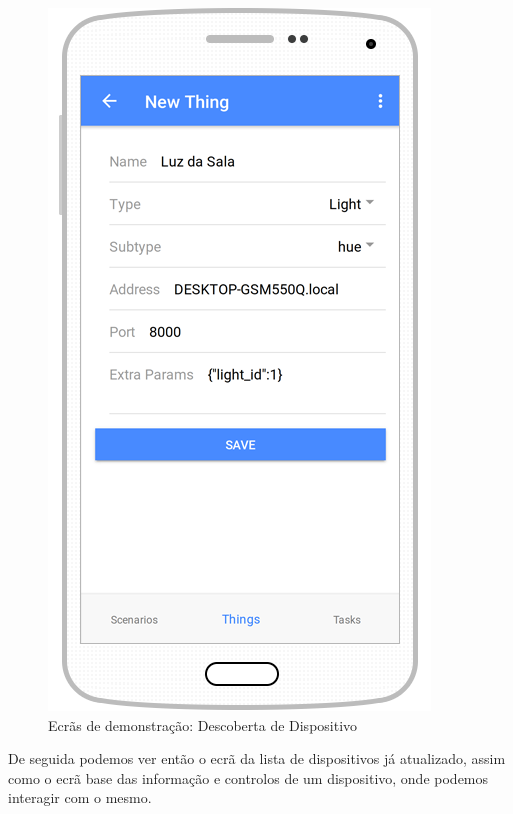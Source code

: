 \begin{figure}[H]
  \centering
        \includegraphics[scale=0.75]{img/demo/new_things_full.png}
  \caption{Ecrãs de demonstração: Descoberta de Dispositivo}
\end{figure}

De seguida podemos ver então o ecrã da lista de dispositivos já atualizado, assim como o ecrã base das informação e controlos de um dispositivo, onde podemos interagir com o mesmo.

